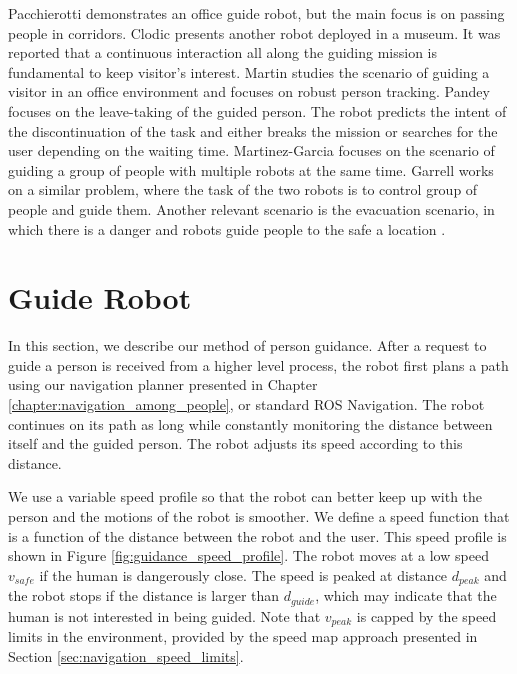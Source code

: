 Pacchierotti \cite{pacchierotti2006design} demonstrates an office guide robot, but the main focus is on passing people in corridors. Clodic \cite{clodic2006rackham} presents another robot deployed in a museum. It was reported that a continuous interaction all along the guiding mission is fundamental to keep visitor's interest. Martin \cite{martin2004conception} studies the scenario of guiding a visitor in an office environment and focuses on robust person tracking. Pandey \cite{pandey2009step} focuses on the leave-taking of the guided person. The robot predicts the intent of the discontinuation of the task and either breaks the mission or searches for the user depending on the waiting time. Martinez-Garcia \cite{martinez2005crowding} focuses on the scenario of guiding a group of people with multiple robots at the same time. Garrell \cite{garrell2010local} works on a similar problem, where the task of the two robots is to control group of people and guide them. Another relevant scenario is the evacuation scenario, in which there is a danger and robots guide people to the safe a location \cite{kim2009portable,robinette2011incorporating}.

\section{Guide Robot}
\label{sec:guidance_guide_robot}

In this section, we describe our method of person guidance. After a request to guide a person is received from a higher level process, the robot first plans a path using our navigation planner presented in Chapter \ref{chapter:navigation_among_people}, or standard ROS Navigation. The robot continues on its path as long while constantly monitoring the distance between itself and the guided person. The robot adjusts its speed according to this distance.

We use a variable speed profile so that the robot can better keep up with the person and the motions of the robot is smoother. We define a speed function that is a function of the distance between the robot and the user. This speed profile is shown in Figure \ref{fig:guidance_speed_profile}. The robot moves at a low speed $v_{safe}$ if the human is dangerously close. The speed is peaked at distance $d_{peak}$ and the robot stops if the distance is larger than $d_{guide}$, which may indicate that the human is not interested in being guided. Note that $v_{peak}$ is capped by the speed limits in the environment, provided by the speed map approach presented in Section \ref{sec:navigation_speed_limits}.

